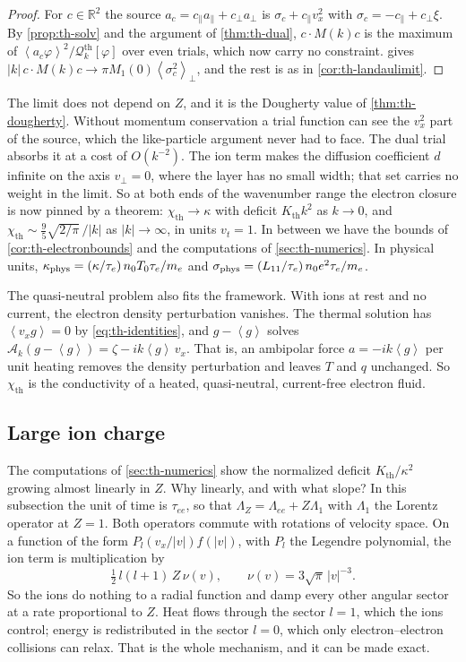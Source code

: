 \documentclass[11pt]{article}
\newcommand{\av}[1]{\left\langle #1\right\rangle}
\newcommand{\A}{\mathcal A}
\newcommand{\RR}{\mathbb R}
\newcommand{\kap}{\kappa}
\newcommand{\thr}{\mathrm{th}}
\newcommand{\Qth}{\mathcal Q^{\thr}}
\theoremstyle{definition}
\theoremstyle{remark}
\numberwithin{equation}{section}
\begin{document}
\begin{proof}
For $c\in\RR^2$ the source $a_c=c_\parallel a_\parallel+c_\perp a_\perp$ is
$\sigma_c+c_\parallel v_x^2$ with $\sigma_c=-c_\parallel+c_\perp\xi$. By
\cref{prop:th-solv} and the argument of \cref{thm:th-dual},
$c\cdot M(k)c$ is the maximum of $\av{a_c\varphi}^2/\Qth_k[\varphi]$ over
even trials, which now carry no constraint.  gives
$|k|\,c\cdot M(k)c\to\pi M_1(0)\av{\sigma_c^2}_\perp$, and the rest is as in
\cref{cor:th-landaulimit}.
\end{proof}

The limit does not depend on $Z$, and it is the Dougherty value of
\cref{thm:th-dougherty}. Without momentum conservation a trial function
can see the $v_x^2$ part of the source, which the like-particle argument
never had to face. The dual trial absorbs it at a cost of $O(k^{-2})$.
The ion term makes the diffusion coefficient $d$ infinite on the axis
$v_\perp=0$, where the layer has no small width; that set carries no
weight in the limit. So at both ends of the wavenumber range the electron
closure is now pinned by a theorem:
$\chi_\thr\to\kap$ with deficit $K_\thr k^2$ as $k\to0$, and
$\chi_\thr\sim\tfrac95\sqrt{2/\pi}\,/|k|$ as $|k|\to\infty$, in units
$v_t=1$. In between we have the bounds of \cref{cor:th-electronbounds}
and the computations of \cref{sec:th-numerics}. In physical units,
$\kap_{\rm phys}=(\kap/\tau_e)\,n_0T_0\tau_e/m_e$ and
$\sigma_{\rm phys}=(L_{11}/\tau_e)\,n_0e^2\tau_e/m_e$.

The quasi-neutral problem also fits the framework. With ions at rest and
no current, the electron density perturbation vanishes. The thermal
solution has $\av{v_xg}=0$ by \eqref{eq:th-identities}, and
$g-\av g$ solves $\A_k(g-\av g)=\zeta-ik\av g\,v_x$. That is, an ambipolar
force $a=-ik\av g$ per unit heating removes the density perturbation and
leaves $T$ and $q$ unchanged. So $\chi_\thr$ is the conductivity of a
heated, quasi-neutral, current-free electron fluid.

\subsection{Large ion charge}\label{sec:th-largeZ}

The computations of \cref{sec:th-numerics} show the normalized deficit
$K_\thr/\kap^2$ growing almost linearly in $Z$. Why linearly, and with what
slope? In this subsection the unit of time is $\tau_{ee}$, so that
$\Lambda_Z=\Lambda_{ee}+Z\Lambda_1$ with $\Lambda_1$ the Lorentz operator at
$Z=1$. Both operators commute with rotations of velocity space. On a
function of the form $P_l(v_x/|v|)f(|v|)$, with $P_l$ the Legendre
polynomial, the ion term is multiplication by
\[
 \tfrac12\,l(l+1)\,Z\,\nu(v),\qquad \nu(v)=3\sqrt\pi\,|v|^{-3} .
\]
So the ions do nothing to a radial function and damp every other angular
sector at a rate proportional to $Z$. Heat flows through the sector
$l=1$, which the ions control; energy is redistributed in the sector
$l=0$, which only electron--electron collisions can relax. That is the
whole mechanism, and it can be made exact.
\end{document}
